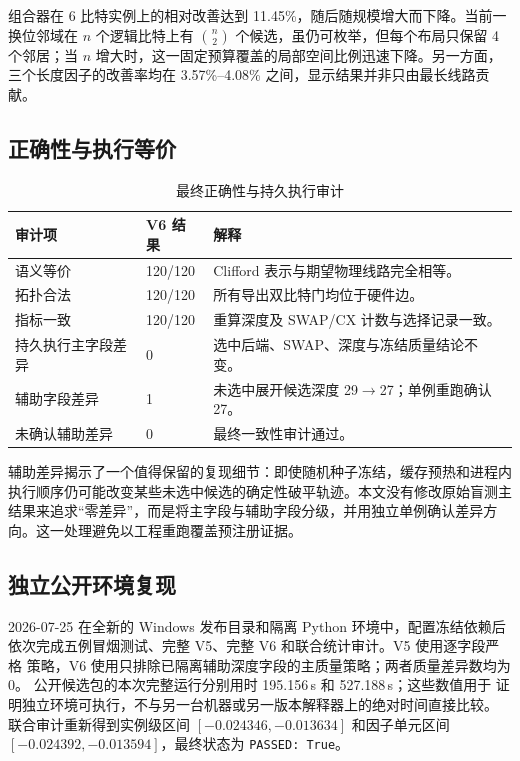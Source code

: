 \documentclass[11pt,a4paper]{article}
\begin{document}
组合器在 6 比特实例上的相对改善达到 11.45\%，随后随规模增大而下降。当前一换位邻域在 $n$ 个逻辑比特上有 $\binom n2$ 个候选，虽仍可枚举，但每个布局只保留 4 个邻居；当 $n$ 增大时，这一固定预算覆盖的局部空间比例迅速下降。另一方面，三个长度因子的改善率均在 3.57\%--4.08\% 之间，显示结果并非只由最长线路贡献。

\subsection{正确性与执行等价}

\begin{table}[H]
\centering
\small
\caption{最终正确性与持久执行审计}
\label{tab:audit}
\begin{tabularx}{\textwidth}{p{}C{2.3cm}Y}
\toprule
审计项 & V6 结果 & 解释 \\
\midrule
语义等价 & 120/120 & Clifford 表示与期望物理线路完全相等。\\
拓扑合法 & 120/120 & 所有导出双比特门均位于硬件边。\\
指标一致 & 120/120 & 重算深度及 SWAP/CX 计数与选择记录一致。\\
持久执行主字段差异 & 0 & 选中后端、SWAP、深度与冻结质量结论不变。\\
辅助字段差异 & 1 & 未选中展开候选深度 29$\rightarrow$27；单例重跑确认 27。\\
未确认辅助差异 & 0 & 最终一致性审计通过。\\
\bottomrule
\end{tabularx}
\end{table}

辅助差异揭示了一个值得保留的复现细节：即使随机种子冻结，缓存预热和进程内执行顺序仍可能改变某些未选中候选的确定性破平轨迹。本文没有修改原始盲测主结果来追求“零差异”，而是将主字段与辅助字段分级，并用独立单例确认差异方向。这一处理避免以工程重跑覆盖预注册证据。

\subsection{独立公开环境复现}



2026-07-25 在全新的 Windows 发布目录和隔离 Python 环境中，配置冻结依赖后
依次完成五例冒烟测试、完整 V5、完整 V6 和联合统计审计。V5 使用逐字段严格
策略，V6 使用只排除已隔离辅助深度字段的主质量策略；两者质量差异数均为 0。
公开候选包的本次完整运行分别用时 195.156\,s 和 527.188\,s；这些数值用于
证明独立环境可执行，不与另一台机器或另一版本解释器上的绝对时间直接比较。
联合审计重新得到实例级区间
$[-0.024346,-0.013634]$ 和因子单元区间
$[-0.024392,-0.013594]$，最终状态为 \texttt{PASSED: True}。
\end{document}
